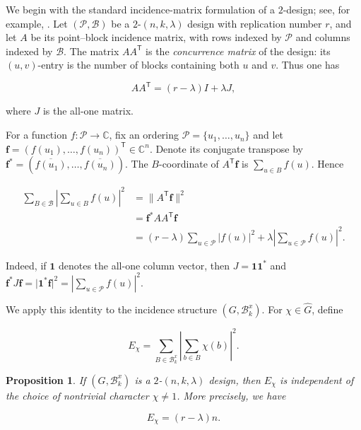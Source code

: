 \documentclass[11pt]{article}
\newtheorem{proposition}[theorem]{Proposition}
\theoremstyle{definition}
\newcommand{\cB}{\mathcal B}
\begin{document}
We begin with the standard incidence-matrix formulation of a
$2$-design; see, for example,
\cite[Chapter~I]{BethJungnickelLenz1999}.
Let $(\mathcal P,\mathcal B)$ be a $2$-$(n,k,\lambda)$ design
with replication number $r$, and let $A$ be its point--block
incidence matrix, with rows indexed by $\mathcal P$ and columns
indexed by $\mathcal B$. The matrix $AA^{\mathsf T}$ is the 
\emph{concurrence matrix} of the design: its $(u,v)$-entry is the number
of blocks containing both $u$ and $v$. Thus one has

$$
AA^{\mathsf T}=(r-\lambda)I+\lambda J,
$$

where $J$ is the all-one matrix.

For a function $f:\mathcal P\to\mathbb C$, fix an ordering
$\mathcal P=\{u_1,\ldots,u_n\}$ and let
$\mathbf f=(f(u_1),\ldots,f(u_n))^{\mathsf T}\in\mathbb C^n$. Denote its conjugate transpose by
$\mathbf f^*=(\overline{f(u_1)},\ldots,\overline{f(u_n)})$.
The $B$-coordinate of $A^{\mathsf T}\mathbf f$ is
$\sum_{u\in B}f(u)$. Hence

\begin{equation}\label{eq:design-second-moment}
	\begin{aligned}
		\sum_{B\in\mathcal B}
		\left|\sum_{u\in B}f(u)\right|^2
		&=\lVert A^{\mathsf T}\mathbf f\rVert^2\\
		&=\mathbf f^*AA^{\mathsf T}\mathbf f\\
		&=(r-\lambda)\sum_{u\in\mathcal P}|f(u)|^2
		+\lambda\left|\sum_{u\in\mathcal P}f(u)\right|^2.
	\end{aligned}
\end{equation}

Indeed, if $\mathbf 1$ denotes the all-one column vector, then
$J=\mathbf 1\mathbf 1^*$ and
$\mathbf f^*J\mathbf f
=\lvert\mathbf 1^*\mathbf f\rvert^2
=\left|\sum_{u\in\mathcal P}f(u)\right|^2$.

We apply this identity to the incidence structure
$(G,\cB_k^x)$. For $\chi\in\widehat G$, define

$$
E_\chi=
\sum_{B\in\cB_k^x}
\left|\sum_{b\in B}\chi(b)\right|^2.
$$

\begin{proposition}\label{prop:design-energy-constant}
	If $(G,\cB_k^x)$ is a $2$-$(n,k,\lambda)$ design, then $E_\chi$
	is independent of the choice of nontrivial character $\chi\ne1$.
	More precisely, we have
	
	$$
	E_\chi=(r-\lambda)n.
	$$
\end{proposition}
\end{document}
